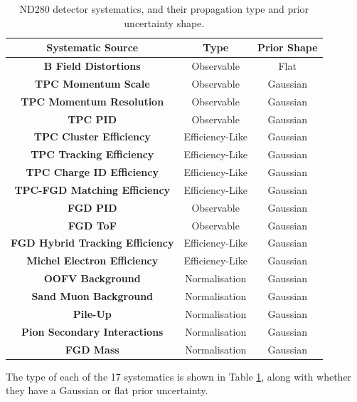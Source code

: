 \begin{center}
\begin{table}
\center
\large
\begin{tabular}{ c||c|c}
\hline
\hline
\textbf{Systematic Source} & \textbf{Type} & \textbf{Prior Shape} \\
\hline
\hline
\textbf{B Field Distortions} & Observable & Flat \\ \hline
\textbf{TPC Momentum Scale} & Observable & Gaussian \\ \hline
\textbf{TPC Momentum Resolution} & Observable & Gaussian \\ \hline
\textbf{TPC PID} & Observable & Gaussian \\ \hline
\textbf{TPC Cluster Efficiency} & Efficiency-Like & Gaussian \\ \hline
\textbf{TPC Tracking Efficiency} & Efficiency-Like & Gaussian \\ \hline
\textbf{TPC Charge ID Efficiency} & Efficiency-Like & Gaussian \\ \hline
\textbf{TPC-FGD Matching Efficiency} & Efficiency-Like & Gaussian \\ \hline
\textbf{FGD PID} & Observable & Gaussian \\ \hline
\textbf{FGD ToF} & Observable & Gaussian \\ \hline
\textbf{FGD Hybrid Tracking Efficiency} & Efficiency-Like & Gaussian \\ \hline
\textbf{Michel Electron Efficiency} & Efficiency-Like & Gaussian \\ \hline
\textbf{OOFV Background} & Normalisation & Gaussian \\ \hline
\textbf{Sand Muon Background} & Normalisation & Gaussian \\ \hline
\textbf{Pile-Up} & Normalisation & Gaussian \\ \hline
\textbf{Pion Secondary Interactions} & Normalisation & Gaussian \\ \hline
\textbf{FGD Mass} & Normalisation & Gaussian \\ 
\hline
\hline
\end{tabular}
\caption{ND280 detector systematics, and their propagation type and prior uncertainty shape.}
\label{tab:detsyst}
\end{table}
\end{center}

The type of each of the 17 systematics is shown in Table \ref{tab:detsyst}, along with whether they have a Gaussian or flat prior uncertainty.

